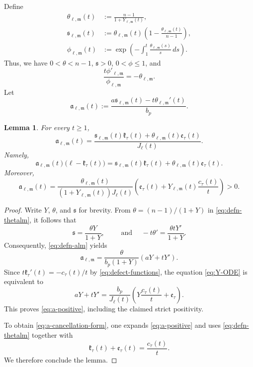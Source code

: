 \documentclass[reqno,12pt]{amsart}
\numberwithin{equation}{section}
\newtheorem{lem}[thm]{Lemma}
\theoremstyle{remark}
\newcommand{\dd}{\,d}
\begin{document}
Define
\begin{equation}\label{eq:defn-thetalm}
\begin{aligned}
 \theta_{\ell,\mathfrak m}(t)  &:=\frac{n-1}{1+Y_{\ell,\mathfrak m}(t)},\\
 \mathfrak s_{\ell,\mathfrak m}(t) &:=\theta_{\ell,\mathfrak m}(t)  \left(1-\frac{\theta_{\ell,\mathfrak m}(t)}{n-1}\right),\\
 \phi_{\ell,\mathfrak m}(t) &:=\exp\left(-\int_1^t \frac{\theta_{\ell,\mathfrak m}(s)}s\dd s\right).
\end{aligned}
\end{equation}
Thus, we have $0<\theta<n-1$, $\mathfrak s>0$, $0<\phi\le1$, and
\begin{equation}\label{eq:phi-derivative}
\frac{t\phi'_{\ell,\mathfrak m}}{\phi_{\ell,\mathfrak m}}=-\theta_{\ell,\mathfrak m}.
\end{equation}
Let
\begin{equation}\label{eq:defn-alm}
\mathfrak a_{\ell,\mathfrak m}(t) :=\frac{a\mathfrak s_{\ell,\mathfrak m}(t)  -t\theta_{\ell,\mathfrak m}'(t)}{b_p}.
\end{equation}

\begin{lem} 
For every $t\ge1$,
\begin{equation}\label{eq:a-cancellation-form}
 \mathfrak a_{\ell,\mathfrak m}(t)
 =\frac{ \mathfrak s_{\ell,\mathfrak m}(t)\mathfrak k_\tau(t)
 +\theta_{\ell,\mathfrak m}(t)\mathfrak e_\tau(t)}
 {J_\ell(t)}.
\end{equation}
Namely,
\begin{equation}\label{eq:key-cancellation}
 \mathfrak a_{\ell,\mathfrak m}(t)
 \bigl(\ell-\mathfrak k_\tau(t)\bigr)
 =\mathfrak s_{\ell,\mathfrak m}(t)\mathfrak k_\tau(t)
  +\theta_{\ell,\mathfrak m}(t)\mathfrak e_\tau(t).
\end{equation}
Moreover,
\begin{equation}\label{eq:a-positive}
 \mathfrak a_{\ell,\mathfrak m}(t)
 =\frac{\theta_{\ell,\mathfrak m}(t)}
 {(1+Y_{\ell,\mathfrak m}(t))J_\ell(t)}
 \left( \mathfrak e_\tau(t) +Y_{\ell,\mathfrak m}(t)\frac{c_\tau(t)}t \right)>0.
\end{equation}
\end{lem}

\begin{proof}
Write $Y$, $\theta$, and $\mathfrak s$ for brevity.  From
$\theta=(n-1)/(1+Y)$ in \eqref{eq:defn-thetalm}, it follows that
$$
\mathfrak s=\frac{\theta Y}{1+Y},
\qquad \text{ and } \quad -t\theta'=\frac{\theta tY'}{1+Y}.
$$
Consequently, \eqref{eq:defn-alm} yields
$$
\mathfrak a_{\ell,\mathfrak m} =\frac{\theta}{b_p(1+Y)}(aY+tY').
$$
Since $t\mathfrak k_\tau'(t)=-c_\tau(t)/t$ by \eqref{eq:defect-functions}, the equation
\eqref{eq:Y-ODE} is equivalent to
$$
aY+tY' =\frac{b_p}{J_\ell(t)}
  \left(Y\frac{c_\tau(t)}t+\mathfrak e_\tau\right).
$$
This proves \eqref{eq:a-positive}, including the claimed strict positivity.  

To obtain \eqref{eq:a-cancellation-form}, one expands \eqref{eq:a-positive} and uses \eqref{eq:defn-thetalm} together with
$$
\mathfrak k_\tau(t)+\mathfrak e_\tau(t) =\frac{c_\tau(t)}t.
$$
We therefore conclude the lemma. 
\end{proof}
\end{document}

